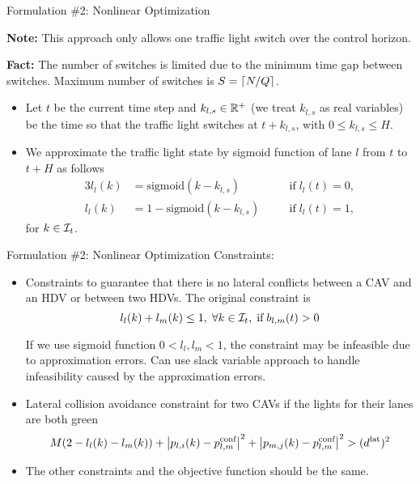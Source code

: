 \documentclass[9pt]{beamer}
\begin{document}
\begin{frame}{Formulation \#2: Nonlinear Optimization}

\textbf{Note:} This approach only allows one traffic light switch over the control horizon.

\textbf{Fact:} The number of switches is limited due to the minimum time gap between switches.
Maximum number of switches is $S = \left\lceil N/Q \right\rceil$.

\begin{itemize}
\item Let $t$ be the current time step and $k_{l,s} \in \mathbb{R}^{+}$ (we treat $k_{l,s}$ as real variables) be the time so that the traffic light switches at $t+k_{l,s}$, with $0 \le k_{l,s} \le H$. 
\item We approximate the traffic light state by sigmoid function of lane $l$ from $t$ to $t+H$ as follows
\begin{alignat*}{3}
l_l (k) &= \mathrm{sigmoid} (k-k_{l,s}) && \quad \text{if} \; l_l (t) = 0, \\
l_l (k) &= 1 - \mathrm{sigmoid} (k-k_{l,s}) && \quad \text{if} \; l_l (t) = 1,
\end{alignat*}
for $k \in \mathcal{I}_t$. 
\end{itemize}
\end{frame}




\begin{frame}{Formulation \#2: Nonlinear Optimization}
Constraints:
\begin{itemize}

\item Constraints to guarantee that there is no lateral conflicts between a CAV and an HDV or between two HDVs. The original constraint is 
\begin{equation*}
l_l (k) + l_m (k) \le 1, \; \forall k \in \mathcal{I}_t, \;\text{if}\; b_{l,m} (t) > 0 
\end{equation*}

If we use sigmoid function $0 < l_l, l_m < 1$, the constraint may be infeasible due to approximation errors.
Can use slack variable approach to handle infeasibility caused by the approximation errors.

\item Lateral collision avoidance constraint for two CAVs if the lights for their lanes are both green
\begin{equation*}
M(2-l_l(k)-l_m(k)) + \left\lvert p_{l,i}(k) - p_{l,m}^{\text{conf}} \right\rvert^2 + \left\lvert p_{m,j}(k) - p_{l,m}^{\text{conf}} \right\rvert^2 > (d^{\text{lat}})^2 
\end{equation*}

\item The other constraints and the objective function should be the same.
\end{itemize}
\end{frame}
\end{document}

